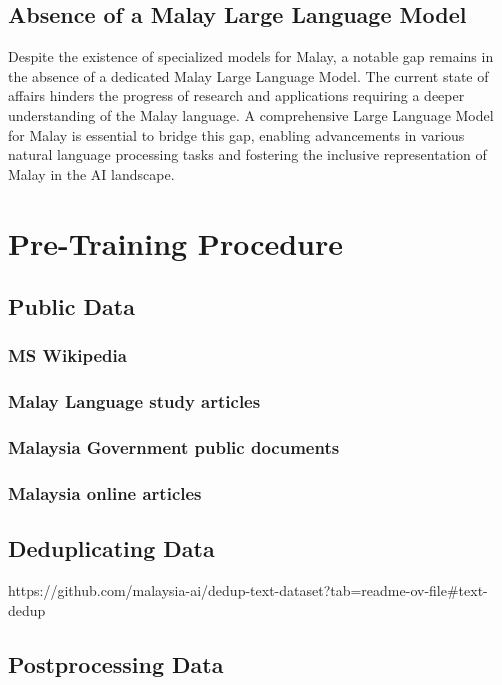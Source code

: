 \documentclass{article}
\begin{document}
\subsection{Absence of a Malay Large Language Model}

Despite the existence of specialized models for Malay, a notable gap remains in the absence of a dedicated Malay Large Language Model. The current state of affairs hinders the progress of research and applications requiring a deeper understanding of the Malay language. A comprehensive Large Language Model for Malay is essential to bridge this gap, enabling advancements in various natural language processing tasks and fostering the inclusive representation of Malay in the AI landscape.

\section{Pre-Training Procedure}

\subsection{Public Data}

\subsubsection{MS Wikipedia}

\subsubsection{Malay Language study articles}

\subsubsection{Malaysia Government public documents}

\subsubsection{Malaysia online articles}

\subsection{Deduplicating Data}

https://github.com/malaysia-ai/dedup-text-dataset?tab=readme-ov-file#text-dedup

\subsection{Postprocessing Data}
\end{document}
